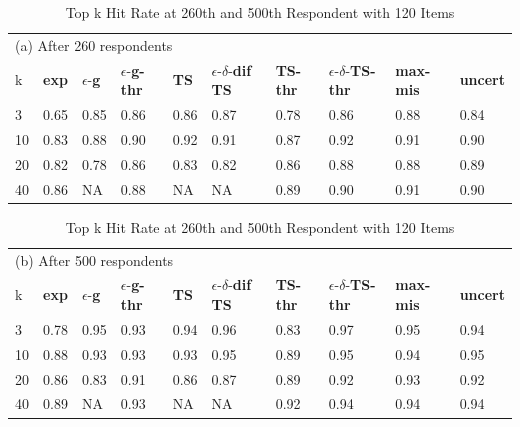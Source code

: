 \documentclass[a4paper,11pt]{article}
\newcommand{\fixedexpressS}{\textbf{exp}}
\newcommand{\egreedyS}{$\epsilon$-\textbf{g}}
\newcommand{\egreedythresS}{$\epsilon$-\textbf{g-thr}}
\newcommand{\misminS}{\textbf{max-mis}}
\newcommand{\tsS}{\textbf{TS} }
\newcommand{\edtsS}{$\epsilon$-$\delta$-\textbf{dif TS} }
\newcommand{\tsthresS}{\textbf{TS-thr} }
\newcommand{\edtsthresS}{$\epsilon$-$\delta$-\textbf{TS-thr} }
\newcommand{\uncertS}{\textbf{uncert} }
\begin{document}
\begin{table}
\caption{Top k Hit Rate at 260th and 500th Respondent with 120 Items}
\label{table:at_260_500}
\begin{center}
\begin{tabular}{llllllllll}
\hline 
\hline
\multicolumn{10}{l}{(a) After 260 respondents}\\
k &  \fixedexpressS&\egreedyS&\egreedythresS&\tsS&\edtsS&\tsthresS&\edtsthresS& \misminS& \uncertS \\ \hline
  3 & 0.65 &   0.85 &  0.86 &   0.86 & 0.87 & 0.78 & 0.86 &    0.88 &   0.84 \\
  10 &  0.83 &   0.88 & 0.90 &   0.92 & 0.91 & 0.87 & 0.92 &    0.91 &   0.90 \\
  20 & 0.82 & 0.78 &  0.86 & 0.83 & 0.82 & 0.86 & 0.88 &  0.88 &   0.89 \\  
  40 &  0.86 &   NA &  0.88 &  NA & NA & 0.89 & 0.90 &  0.91 &   0.90 \\
\hline
\hline
\end{tabular}
\begin{tabular}{llllllllll}
\multicolumn{10}{l}{(b) After 500 respondents}\\
k &  \fixedexpressS&\egreedyS&\egreedythresS&\tsS&\edtsS&\tsthresS&\edtsthresS& \misminS& \uncertS  \\
\hline
   3 & 0.78 &   0.95 & 0.93 & 0.94 & 0.96 & 0.83 & 0.97 &    0.95 &   0.94 \\
  10 &  0.88 &   0.93 &  0.93 &   0.93 & 0.95 & 0.89 & 0.95 &    0.94 &   0.95 \\  
  20 &  0.86 &   0.83 & 0.91 &  0.86 & 0.87 & 0.89 & 0.92 &  0.93 &   0.92 \\ 
  40 &  0.89 &   NA & 0.93 & NA & NA & 0.92 &  0.94 & 0.94 & 0.94 \\
\hline 
\hline
\end{tabular}
\end{center}
\end{table}

\end{document}
